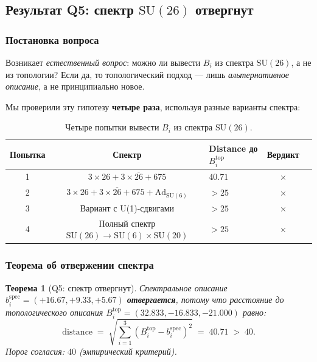 \documentclass[11pt,a4paper]{article}
\newcommand{\SU}{\ensuremath{\mathrm{SU}}}
\newcommand{\Ad}{\ensuremath{\mathrm{Ad}}}
\newtheorem{theorem}{Теорема}[section]
\theoremstyle{definition}
\begin{document}
\subsection{Результат Q5: спектр \texorpdfstring{$\SU(26)$}{(26)} отвергнут}
\label{subsec:bi-q5}

\subsubsection{Постановка вопроса}

Возникает \emph{естественный вопрос}: можно ли вывести $B_i$
из спектра $\SU(26)$, а не из топологии? Если да, то
топологический подход --- лишь \emph{альтернативное описание},
а не принципиально новое.

\medskip\noindent
Мы проверили эту гипотезу \textbf{четыре раза}, используя
разные варианты спектра:

\begin{table}[ht]
\centering
\caption{Четыре попытки вывести \texorpdfstring{$B_i$}{B\_i} из спектра \texorpdfstring{$\SU(26)$}{(26)}.}
\label{tab:spectrum-attempts-q5}
\begin{tabular}{cclcc}
\toprule
Попытка & Спектр & Distance до $B_i^{\text{top}}$ & Вердикт \\
\midrule
1 & $3 \times 26 + 3 \times \overline{26} + 675$ & $40.71$ & $\times$ \\
2 & $3 \times 26 + 3 \times \overline{26} + 675 + \Ad_{\SU(6)}$ & $> 25$ & $\times$ \\
3 & Вариант с U(1)-сдвигами & $> 25$ & $\times$ \\
4 & Полный спектр $\SU(26) \to \SU(6) \times \SU(20)$ & $> 25$ & $\times$ \\
\bottomrule
\end{tabular}
\end{table}

\subsubsection{Теорема об отвержении спектра}

\begin{theorem}[Q5: спектр отвергнут]
\label{thm:q5-rejected}
Спектральное описание $b_i^{\text{spec}} = (+16.67, +9.33, +5.67)$
\textbf{отвергается}, потому что расстояние до топологического
описания $B_i^{\text{top}} = (32.833, -16.833, -21.000)$ равно:
\begin{equation}
    \boxed{
    \text{distance} \;=\; \sqrt{\sum_{i=1}^{3}
    (B_i^{\text{top}} - b_i^{\text{spec}})^2} \;=\; 40.71 \;>\; 40.
    }
    \label{eq:distance-q5}
\end{equation}
Порог согласия: $40$ (эмпирический критерий).
\end{theorem}
\end{document}

